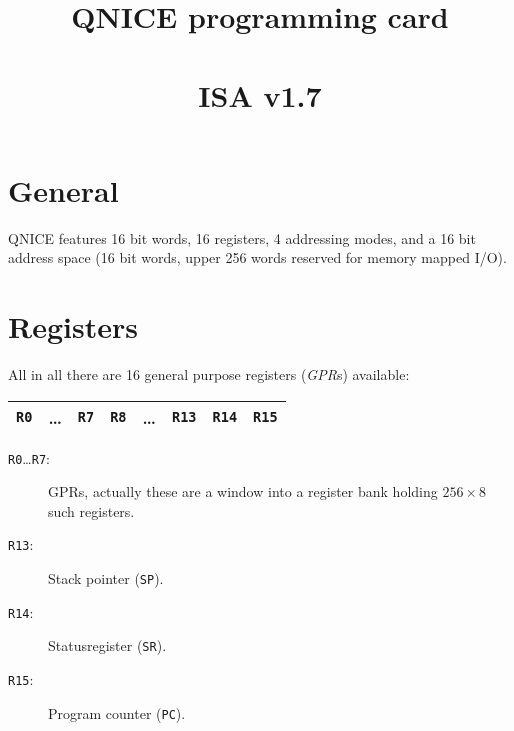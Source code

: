 \documentclass{leaflet}
\begin{document}
 \title{\vspace*{-1cm}QNICE programming card\\~\\ISA v1.7}
 \maketitle
 \vspace*{-1cm}
%
 \section{General}
  QNICE features 16 bit words, 16 registers, 4 addressing modes, and 
  a 16 bit address space (16 bit words, upper 256 words reserved for
  memory mapped I/O).
  \vspace*{-5mm}
%
 \section{Registers}
  All in all there are 16 general purpose registers (\emph{GPR}s) available:
  \begin{center}
   \vspace*{-2mm}
   \begin{longtable}{|c|c|c||c|c|c|c|c|}
    \hline
    {\tt R0}&\dots&{\tt R7}&{\tt R8}&\dots&{\tt R13}&{\tt R14}&{\tt R15}\\
    \hline
   \end{longtable}
   \vspace*{-9mm}
  \end{center}
  \begin{description}
   \item [\texttt{R0}\dots\texttt{R7}:] GPRs, actually 
    these are a window into a register bank holding $256\times 8$ such 
    registers.
   \item [\texttt{R13}:] Stack pointer (\texttt{SP}).
   \item [\texttt{R14}:] Statusregister (\texttt{SR}).
   \item [\texttt{R15}:] Program counter (\texttt{PC}).
  \end{description}
%
\end{document}
